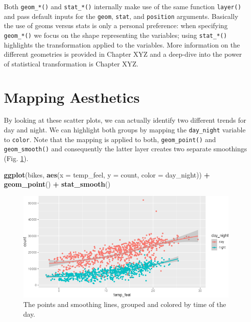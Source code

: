 \documentclass[
]{krantz}
\makeatletter
\newenvironment{Shaded}{\begin{snugshade}}{\end{snugshade}}
\newcommand{\AttributeTok}[1]{\textcolor[rgb]{0.27,0.27,0.27}{#1}}
\newcommand{\FunctionTok}[1]{\textcolor[rgb]{0.27,0.27,0.27}{\textbf{#1}}}
\newcommand{\NormalTok}[1]{#1}
\newcommand{\SpecialCharTok}[1]{\textcolor[rgb]{0.43,0.43,0.43}{\textbf{#1}}}
\newenvironment{kframe}{%
\medskip{}
\setlength{\fboxsep}{.8em}
 \def\at@end@of@kframe{}%
 \ifinner\ifhmode%
  \def\at@end@of@kframe{\end{minipage}}%
  \begin{minipage}{\columnwidth}%
 \fi\fi%
 \def\FrameCommand##1{\hskip\@totalleftmargin \hskip-\fboxsep
 \colorbox{shadecolor}{##1}\hskip-\fboxsep
     \hskip-\linewidth \hskip-\@totalleftmargin \hskip\columnwidth}%
 \MakeFramed {\advance\hsize-\width
   \@totalleftmargin\z@ \linewidth\hsize
   \@setminipage}}%
 {\par\unskip\endMakeFramed%
 \at@end@of@kframe}
\renewenvironment{Shaded}{\begin{kframe}}{\end{kframe}}
\makeatother
\begin{document}
Both \texttt{geom\_*()} and \texttt{stat\_*()} internally make use of the same function \texttt{layer()} and pass default inputs for the \texttt{geom}, \texttt{stat}, and \texttt{position} arguments. Basically the use of geoms versus stats is only a personal preference: when specifying \texttt{geom\_*()} we focus on the shape representing the variables; using \texttt{stat\_*()} highlights the transformation applied to the variables. More information on the different geometries is provided in Chapter XYZ and a deep-dive into the power of statistical transformation is Chapter XYZ.

\hypertarget{map-aesthetics}{%
\section{Mapping Aesthetics}\label{map-aesthetics}}

By looking at these scatter plots, we can actually identify two different trends for day and night. We can highlight both groups by mapping the \texttt{day\_night} variable to \texttt{color}. Note that the mapping is applied to both, \texttt{geom\_point()} and \texttt{geom\_smooth()} and consequently the latter layer creates two separate smoothings (Fig. \ref{fig:04ggplotBasicColor}).

\begin{Shaded}
\begin{Highlighting}[]
\FunctionTok{ggplot}\NormalTok{(bikes, }\FunctionTok{aes}\NormalTok{(}\AttributeTok{x =}\NormalTok{ temp\_feel, }\AttributeTok{y =}\NormalTok{ count, }\AttributeTok{color =}\NormalTok{ day\_night)) }\SpecialCharTok{+} 
  \FunctionTok{geom\_point}\NormalTok{() }\SpecialCharTok{+} 
  \FunctionTok{stat\_smooth}\NormalTok{()}
\end{Highlighting}
\end{Shaded}

\begin{figure}
\centering
\includegraphics{bookdown_files/figure-latex/04ggplotBasicColor-1.png}
\caption{\label{fig:04ggplotBasicColor}The points and smoothing lines, grouped and colored by time of the day.}
\end{figure}
\end{document}
